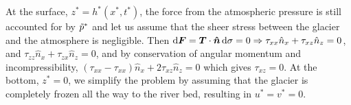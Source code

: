 At the surface, $z^* = h^*(x^*,t^*)$, the force from the atmospheric pressure is still accounted for by $\Tilde{p}^*$ and let us assume that the sheer stress between the glacier and the atmosphere is negligible. Then $\dif{\boldsymbol{F}} = \boldsymbol{T} \cdot \boldsymbol{\hat{n}} \dif{\sigma} = 0 \Rightarrow \tau_{xx}\hat{n}_x + \tau_{xz}\hat{n}_z = 0 $, and $\tau_{zz}\hat{n}_x + \tau_{zx}\hat{n}_z = 0$, and by conservation of angular momentum and incompressibility, $(\tau_{xx} - \tau_{xx})\hat{n}_x + 2\tau_{xz}\hat{n}_z = 0 $ which gives $ \tau_{xz} = 0 $. At the bottom, $z^* = 0$, we simplify the problem by assuming that the glacier is completely frozen all the way to the river bed, resulting in $u^* = v^* = 0$. 